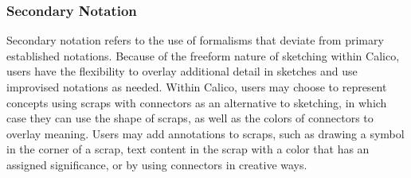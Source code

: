 \documentclass[12pt,fleqn]{ucithesis}
\begin{document}


\subsubsection{Secondary Notation}

Secondary notation refers to the use of formalisms that deviate from primary established notations. Because of the freeform nature of sketching within Calico, users have the flexibility to overlay additional detail in sketches and use improvised notations as needed. Within Calico, users may choose to represent concepts using scraps with connectors as an alternative to sketching, in which case they can use the shape of scraps, as well as the colors of connectors to overlay meaning. Users may add annotations to scraps, such as drawing a symbol in the corner of a scrap, text content in the scrap with a color that has an assigned significance, or by using connectors in creative ways.
\end{document}

